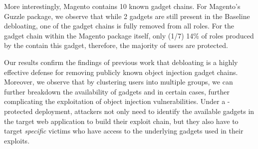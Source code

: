 More interestingly, Magento contains 10 known gadget chains. 
For Magento's Guzzle package, we observe that while 2 gadgets are still present in the Baseline debloating, one of the gadget chains is fully removed from all roles.
For the gadget chain within the Magento package itself, only (1/7) 14\% of roles produced by the \dbltr{} contain this gadget, therefore, the majority of users are protected.

Our results confirm the findings of previous work that debloating is a highly effective defense for removing publicly known object injection gadget chains. 
Moreover, we observe that by clustering users into multiple groups, we can further breakdown the availability of gadgets and in certain cases, further complicating the exploitation of object injection vulnerabilities. Under a \dbltr{}-protected deployment, attackers not only need to identify the available gadgets in the target web application to build their exploit chain, but they also have to target \emph{specific} victims who have access to the underlying gadgets used in their exploits. 

\begin{table}[t]
    \centering
    \caption{PHP Object Injection Gadgets statistics after debloating. Listing number of existing gadgets for Baseline and the percentage of roles in \dbltr{} exposed to those gadgets.}
    \label{tab:poi_gadgets}
\end{table}

